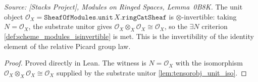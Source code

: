 \begin{lemma}\leanok
  \label{lem:unit_isinvertible}
  \textit{Source: [Stacks Project], Modules on Ringed Spaces, Lemma~0B8K.}
  The unit object \(\mathcal{O}_X = \mathtt{SheafOfModules.unit}\,X.\mathtt{ringCatSheaf}\)
  is \(\otimes\)-invertible: taking \(N = \mathcal{O}_X\), the substrate unitor gives
  \(\mathcal{O}_X \otimes_X \mathcal{O}_X \cong \mathcal{O}_X\), so the \(\exists N\)
  criterion \cref{def:scheme_modules_isinvertible} is met. This is the invertibility of
  the identity element of the relative Picard group law.
\end{lemma}
\begin{proof}
  \leanok
  Proved directly in Lean. The witness is \(N = \mathcal{O}_X\) with the isomorphism
  \(\mathcal{O}_X \otimes_X \mathcal{O}_X \cong \mathcal{O}_X\) supplied by the substrate
  unitor \cref{lem:tensorobj_unit_iso}.
\end{proof}

